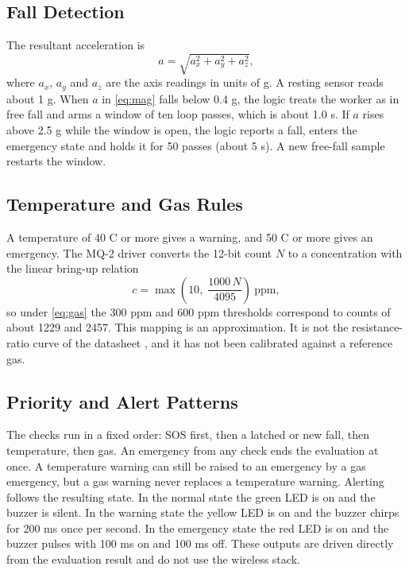 \documentclass[conference]{IEEEtran}
\begin{document}
\subsection{Fall Detection}
The resultant acceleration is
\begin{equation}
a = \sqrt{a_x^{2} + a_y^{2} + a_z^{2}},
\label{eq:mag}
\end{equation}
where $a_x$, $a_y$ and $a_z$ are the axis readings in units of g. A resting sensor reads about 1 g. When $a$ in \eqref{eq:mag} falls below 0.4 g, the logic treats the worker as in free fall and arms a window of ten loop passes, which is about 1.0 s. If $a$ rises above 2.5 g while the window is open, the logic reports a fall, enters the emergency state and holds it for 50 passes (about 5 s). A new free-fall sample restarts the window.

\subsection{Temperature and Gas Rules}
A temperature of 40 \textdegree C or more gives a warning, and 50 \textdegree C or more gives an emergency. The MQ-2 driver converts the 12-bit count $N$ to a concentration with the linear bring-up relation
\begin{equation}
c = \max\!\left(10,\; \frac{1000\,N}{4095}\right)\ \text{ppm},
\label{eq:gas}
\end{equation}
so under \eqref{eq:gas} the 300 ppm and 600 ppm thresholds correspond to counts of about 1229 and 2457. This mapping is an approximation. It is not the resistance-ratio curve of the datasheet \cite{mq2}, and it has not been calibrated against a reference gas.

\subsection{Priority and Alert Patterns}
The checks run in a fixed order: SOS first, then a latched or new fall, then temperature, then gas. An emergency from any check ends the evaluation at once. A temperature warning can still be raised to an emergency by a gas emergency, but a gas warning never replaces a temperature warning. Alerting follows the resulting state. In the normal state the green LED is on and the buzzer is silent. In the warning state the yellow LED is on and the buzzer chirps for 200 ms once per second. In the emergency state the red LED is on and the buzzer pulses with 100 ms on and 100 ms off. These outputs are driven directly from the evaluation result and do not use the wireless stack.
\end{document}
